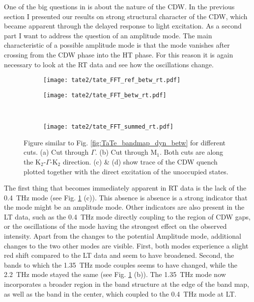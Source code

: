 One of the big questions in  is about the nature of the CDW.
In the previous section I presented our results on strong structural character of the CDW, which became apparent through the delayed response to light excitation.
As a second part I want to address the question of an amplitude mode.
The main characteristic of a possible amplitude mode is that the mode vanishes after crossing from the CDW phase into the HT phase.
For this reason it is again necessary to look at the RT data and see how the oscillations change.

\begin{figure}[b!]
	\centering
	\begin{subfigure}[b]{0.33\textwidth}
		\texttt{[image: tate2/tate\_FFT\_ref\_betw\_rt.pdf]}
		\caption{}
	\end{subfigure}
	\begin{subfigure}[b]{0.66\textwidth}
		\texttt{[image: tate2/tate\_FFT\_betw\_rt.pdf]}
		\caption{}
	\end{subfigure}
	\\
	\begin{subfigure}[b]{0.33\textwidth}
		\texttt{[image: tate2/tate\_FFT\_summed\_rt.pdf]}
		\caption{}
	\end{subfigure}
	\caption{Figure similar to Fig. \ref{fig:TaTe_bandmap_dyn_betw} for different cuts. (a) Cut through $\Gamma$. (b) Cut through M$_1$. Both cuts are along the K$_2$-$\Gamma$-K$_2$ direction. (c) \& (d) show trace of the CDW quench plotted together with the direct excitation of the unoccupied states.}
	\label{fig:TaTe_FFT_betw_rt}
\end{figure}

The first thing that becomes immediately apparent in RT data is the lack of the \qty{0.4}{\tera\hertz} mode (see Fig. \ref{fig:TaTe_FFT_betw_rt} (c)).
This absence is absence is a strong indicator that the mode might be an amplitude mode.
Other indicators are also present in the LT data, such as the \qty{0.4}{\tera\hertz} mode directly coupling to the region of CDW gaps, or the oscillations of the mode having the strongest effect on the observed intensity.
Apart from the changes to the potential Amplitude mode, additional changes to the two other modes are visible.
First, both modes experience a slight red shift compared to the LT data and seem to have broadened.
Second, the bands to which the \qty{1.35}{\tera\hertz} mode couples seems to have changed, while the \qty{2.2}{\tera\hertz} mode stayed the same (see Fig. \ref{fig:TaTe_FFT_betw_rt} (b)).
The \qty{1.35}{\tera\hertz} mode now incorporates a broader region in the band structure at the edge of the band map, as well as the band in the center, which coupled to the \qty{0.4}{\tera\hertz} mode at LT.

